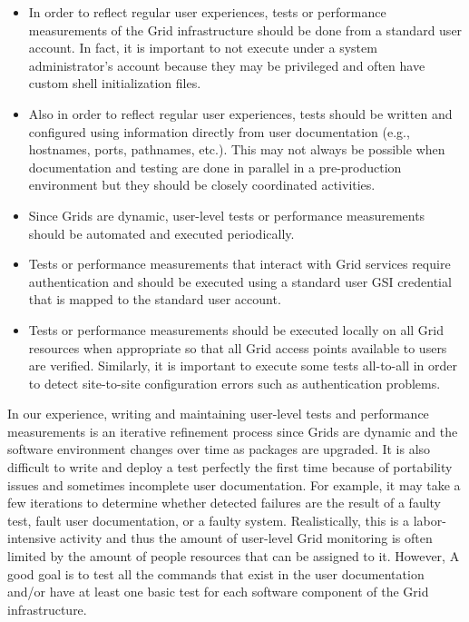 \documentclass[times,10pt,twocolumn]{article}
\begin{document}
\begin{itemize}

\item In order to reflect regular user experiences, tests or performance
measurements of the Grid infrastructure should be done from a standard user
account.  In fact, it is important to not execute under a system
administrator's account because they may be privileged and often have custom
shell initialization files.

\item Also in order to reflect regular user experiences, tests should be
written and configured using information directly from user documentation
(e.g., hostnames, ports, pathnames, etc.).  This may not always be possible
when documentation and testing are done in parallel in a pre-production
environment but they should be closely coordinated activities. 

\item Since Grids are dynamic, user-level tests or performance measurements
should be automated and executed periodically.

\item Tests or performance measurements that interact with Grid services
require authentication and should be executed using a standard user GSI
credential that is mapped to the standard user account.  

\item Tests or performance measurements should be executed locally on all Grid
resources when appropriate so that all Grid access points available to users
are verified.  Similarly, it is important to execute some tests all-to-all
in order to detect site-to-site configuration errors such as authentication
problems.

\end{itemize}

\noindent In our experience, writing and maintaining user-level tests and
performance measurements is an iterative refinement process since Grids are
dynamic and the software environment changes over time as packages are
upgraded.  It is also difficult to write and deploy a test perfectly the first
time because of portability issues and sometimes incomplete user
documentation.  For example, it may take a few iterations to determine whether
detected failures are the result of a faulty test, fault user documentation,
or a faulty system.  Realistically, this is a labor-intensive activity and
thus the amount of user-level Grid monitoring is often limited by the amount
of people resources that can be assigned to it.  However, A good goal is to
test all the commands that exist in the user documentation and/or have at
least one basic test for each software component of the Grid infrastructure.  
\end{document}
